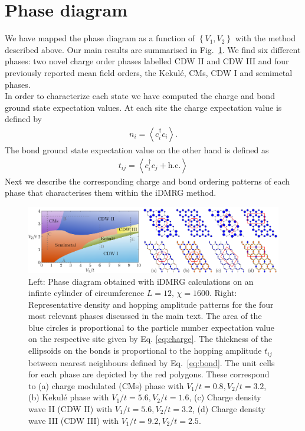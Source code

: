 \documentclass[aps,prx,10pt,twocolumn,floatfix,superscriptaddress,showpacs,numerical,footinbib]{revtex4-1}
\begin{document}
\section{\label{sec:phasediagram}Phase diagram}
%
We have mapped the phase diagram as a function of $\left\lbrace V_{1},V_{2}\right\rbrace$ with the method described above.
%
Our main results are summarised in Fig.~\ref{fig:phase diagram}.
%
We find six different phases: two novel charge order phases labelled CDW II and CDW III and four previously 
reported mean field orders, the Kekul\'{e}, CMs, CDW I and semimetal phases.\\
%
In order to characterize each state we have computed the charge and bond ground state expectation values.
%
At each site the charge expectation value is defined by 
%
\begin{eqnarray}
\label{eq:charge}
n_{i}=\left\langle c^{\dagger}_{i}c_{i}\right\rangle.
\end{eqnarray}
%
The bond ground state expectation value on the other hand is defined as
%
\begin{eqnarray}
\label{eq:bond}
t_{ij}=\left\langle c^{\dagger}_{i}c_{j}+\mathrm{h.c.}\right\rangle
\end{eqnarray}
%
%
Next we describe the corresponding charge and bond ordering patterns of each phase 
that characterises them within the iDMRG method.

\begin{figure}
 \includegraphics[width=\textwidth]{pdf/phase_diagram_ext.pdf}
 \caption{Left: Phase diagram obtained with iDMRG calculations on an infinte cylinder of circumference $L=12, \, \chi = 1600$. 
 Right: Representative density and hopping amplitude patterns for the four most relevant phases discussed in the main text. 
 The area of the blue circles is proportional to the particle number expectation value on the respective site given by Eq. \eqref{eq:charge}. 
 The thickness of the ellipsoids on the bonds is proportional to the hopping amplitude $t_{ij}$ between nearest neighbours defined by Eq.~\eqref{eq:bond}.
 The unit cells for each phase are depicted by the red polygons. 
 These correspond to (a) charge modulated (CMs) phase with $V_1/t = 0.8, V_2/t = 3.2 $, (b) Kekul\'e phase with $V_1/t = 5.6, V_2/t = 1.6 $, (c) Charge density wave II (CDW II) with $V_1/t = 5.6, V_2/t = 3.2$,  (d) Charge density wave III (CDW III) with $V_1/t = 9.2, V_2/t = 2.5$. 
 \label{fig:phase diagram}}
\end{figure}
\end{document}
